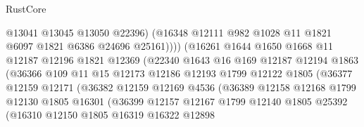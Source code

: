 \begin{lexlean}{RustCore}
\begin{coremodule}
                                @13041
                                @13045
                                @13050
                                @22396)
                              (@16348
                                @12111
                                @982
                                @1028
                                @11
                                @1821
                                @6097
                                @1821
                                @6386
                                @24696
                                @25161))))
                        (@16261
                          @1644
                          @1650
                          @1668
                          @11
                          @12187
                          @12196
                          @1821
                          @12369
                          (@22340
                            @1643
                            @16
                            @169
                            @12187
                            @12194
                            @1863
                            (@36366
                              @109
                              @11
                              @15
                              @12173
                              @12186
                              @12193
                              @1799
                              @12122
                              @1805
                              (@36377
                                @12159
                                @12171
                                (@36382
                                  @12159
                                  @12169
                                  @4536
                                  (@36389
                                    @12158
                                    @12168
                                    @1799
                                    @12130
                                    @1805
                                    @16301
                                    (@36399
                                      @12157
                                      @12167
                                      @1799
                                      @12140
                                      @1805
                                      @25392
                                      (@16310
                                        @12150
                                        @1805
                                        @16319
                                        @16322
                                        @12898

\end{coremodule}
\end{lexlean}
